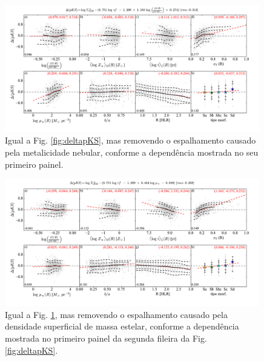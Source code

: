\begin{figure}
	\centering
	\includegraphics[width=0.99\textwidth]{figuras/deltapKS_noOH.pdf}
	\caption[Resíduos da {\em pseudo-KS} removendo o espalhamento com \left(\right).]
	{Igual a Fig. \ref{fig:deltapKS}, mas removendo o espalhamento causado pela metalicidade
nebular, conforme a dependência mostrada no seu primeiro painel.}
	\label{fig:deltapKS_noOH}
\end{figure}

\begin{figure}
	\centering
	\includegraphics[width=0.99\textwidth]{figuras/deltapKS_noMcorSD.pdf}
	\caption[Resíduos da {\em pseudo-KS} removendo o espalhamento com $\mu_\star$.]
	{Igual a Fig. \ref{fig:deltapKS_noOH}, mas removendo o espalhamento causado pela
densidade superficial de massa estelar, conforme a dependência mostrada no primeiro painel da
segunda fileira da Fig. \ref{fig:deltapKS}.}
	\label{fig:deltapKS_noMcorSD}
\end{figure}

